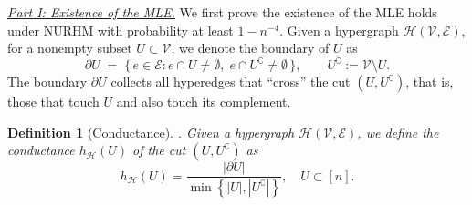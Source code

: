 \documentclass[
  12pt]{article}
\newtheorem{definition}{Definition}
\begin{document}
\underline{\it Part I: Existence of the MLE.} We first prove the existence of the MLE holds under NURHM with probability at least $1 - n^{-4}$. Given a hypergraph $\mathcal{H}(\mathcal{V},\mathcal{E})$, for a nonempty subset $U\subset \mathcal{V}$, we denote the boundary of $U$ as
\[
\partial U \;=\; \big\{\, e\in \mathcal{E} : e\cap U\neq \emptyset,\; e\cap U^{\complement}\neq \emptyset \,\big\},
\qquad
U^{\complement} := \mathcal{V}\setminus U.
\]
The boundary $\partial U$ collects all hyperedges that “cross” the cut $(U,U^{\complement})$, that is, those that touch $U$ and also touch its complement.
\begin{definition}[Conductance]. Given a hypergraph $\mathcal{H}(\mathcal{V}, \mathcal{E})$, we define the conductance $h_{\mathcal{H}}(U)$ of the cut $(U,U^\complement)$ as
$$h_{\mathcal{H}}(U)=\frac{|\partial U|}{\min \left\{|U|,\left|U^{\complement}\right|\right\}}, \quad U \subset[n].$$
\end{definition}
\end{document}
